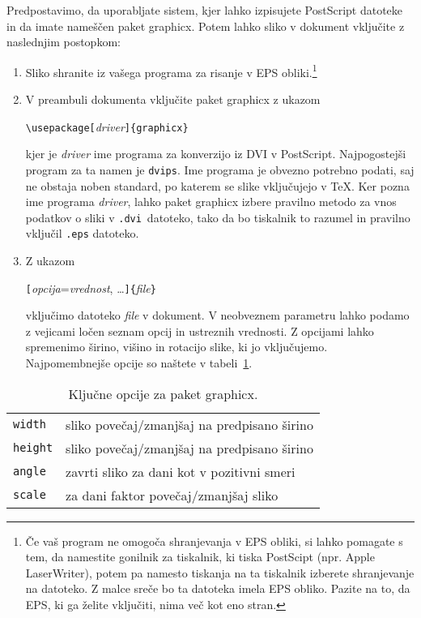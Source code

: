 Predpostavimo, da uporabljate sistem, kjer lahko izpisujete PostScript datoteke
in da imate nameščen paket \textsf{graphicx}. Potem lahko sliko v dokument 
vključite z naslednjim postopkom:

\begin{enumerate}
\item Sliko shranite iz vašega programa za risanje v  EPS 
    obliki.\footnote{Če vaš program ne omogoča shranjevanja v EPS obliki, si lahko pomagate s tem,
    da namestite gonilnik za tiskalnik, ki tiska PostScipt (npr. Apple
    LaserWriter), potem pa namesto tiskanja na ta tiskalnik izberete shranjevanje na datoteko. Z malce sreče
    bo ta datoteka imela EPS obliko. Pazite na to, da EPS, ki ga želite vključiti, nima več kot eno stran.
    }
\item V preambuli dokumenta vključite paket \textsf{graphicx} z ukazom
\begin{lscommand}
\verb|\usepackage[|\emph{driver}\verb|]{graphicx}|
\end{lscommand}
kjer je \emph{driver} ime programa za konverzijo iz DVI v PostScript. Najpogostejši program za ta namen
je \texttt{dvips}. Ime programa je obvezno potrebno podati, saj ne 
obstaja noben standard, po katerem
se slike vključujejo v \TeX{}. Ker pozna ime programa \emph{driver}, lahko
paket \textsf{graphicx} izbere pravilno metodo za vnos podatkov o sliki v \texttt{.dvi}~datoteko, tako da 
bo tiskalnik to razumel in pravilno vključil \texttt{.eps} datoteko.
\item Z ukazom 
\begin{lscommand}
\verb|[|\emph{opcija}=\emph{vrednost}, \ldots\verb|]{|\emph{file}\verb|}|
\end{lscommand}
vključimo datoteko \emph{file} v dokument. V neobveznem parametru lahko podamo 
z vejicami ločen seznam opcij in ustreznih vrednosti. Z opcijami lahko 
spremenimo širino, višino in rotacijo slike, ki jo vključujemo. Najpomembnejše opcije so 
naštete v tabeli~\ref{keyvals}.
\end{enumerate}

\begin{table}[htb]
\caption{Ključne opcije za paket \textsf{graphicx}.}
\label{keyvals}
\begin{lined}{10cm}
\begin{tabular}{@{}ll}
\texttt{width}& sliko povečaj/zmanjšaj na predpisano širino\\
\texttt{height}&  sliko povečaj/zmanjšaj na predpisano širino\\
\texttt{angle}& zavrti sliko za dani kot v pozitivni smeri\\
\texttt{scale}& za dani faktor povečaj/zmanjšaj sliko\\
\end{tabular}


\bigskip
\end{lined}
\end{table}

